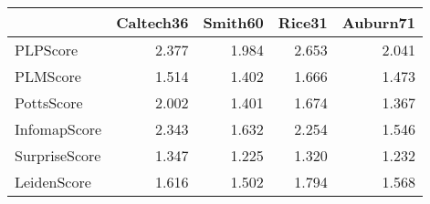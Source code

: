 \begin{tabular}{lrrrr}
\toprule
{} & Caltech36 & Smith60 & Rice31 & Auburn71 \\
\midrule
PLPScore      &     2.377 &   1.984 &  2.653 &    2.041 \\
PLMScore      &     1.514 &   1.402 &  1.666 &    1.473 \\
PottsScore    &     2.002 &   1.401 &  1.674 &    1.367 \\
InfomapScore  &     2.343 &   1.632 &  2.254 &    1.546 \\
SurpriseScore &     1.347 &   1.225 &  1.320 &    1.232 \\
LeidenScore   &     1.616 &   1.502 &  1.794 &    1.568 \\
\bottomrule
\end{tabular}
